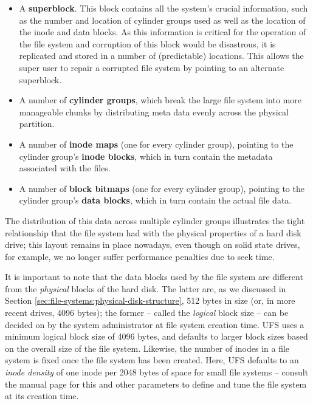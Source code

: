 \begin{itemize}
	\item A {\bf superblock}.  This block contains all the
		system's crucial information, such as the number and
		location of cylinder groups used as well as the location of the
		inode and data blocks.  As this information is critical for
		the operation of the file system and corruption of this
		block would be disastrous, it is replicated and stored in
		a number of (predictable) locations.  This allows
		the super user to repair a corrupted file system by pointing to an
		alternate superblock.
	\item A number of {\bf cylinder groups}, which break the large
		file system into more manageable chunks by distributing
		meta data evenly across the physical partition.
	\item A number of {\bf inode maps} (one for every cylinder group),
		pointing to the cylinder group's {\bf inode blocks}, which
		in turn contain the metadata associated with the files.
	\item A number of {\bf block bitmaps} (one for every cylinder
		group), pointing to the cylinder group's {\bf data blocks},
		which in turn contain the actual file data.
\end{itemize}

The distribution of this data across multiple cylinder
groups illustrates the tight relationship that the
file system had with the physical properties of a hard
disk drive; this layout remains in place nowadays,
even though on solid state drives, for example, we no
longer suffer performance penalties due to seek time.

It is important to note that the data blocks used by
the file system are different from the {\em physical}
blocks of the hard disk.  The latter are, as we
discussed in Section
\ref{sec:file-systems:physical-disk-structure}, 512
bytes in size (or, in more recent drives, 4096 bytes);
the former -- called the {\em logical} block size --
can be decided on by the system administrator at file
system creation time.  UFS uses a minimum logical
block size of 4096 bytes, and defaults to larger block
sizes based on the overall size of the file system.
Likewise, the number of inodes in a file system is
fixed once the file system has been created.  Here,
UFS defaults to an {\em inode density} of one inode
per 2048 bytes of space for small file systems --
consult the  manual
page for this and other parameters to define and tune
the file system at its creation time. \\


